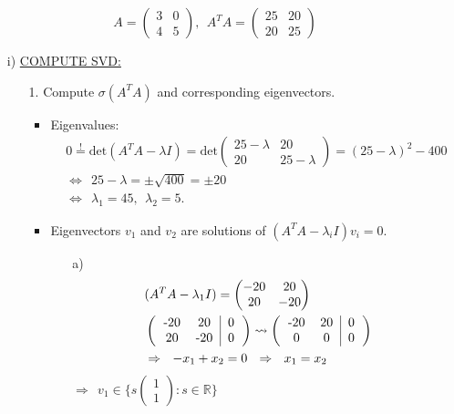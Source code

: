 {
\color{solution}
$$
A=\begin{pmatrix}3&0\\4&5\end{pmatrix},\ \ A^TA=\begin{pmatrix}25&20\\20&25\end{pmatrix}
$$
\begin{enumerate}
	\item[i)]
	\underline{COMPUTE SVD:}
	\begin{enumerate}
		\item[1.]
		Compute $\sigma(A^TA)$ and corresponding eigenvectors.
		\begin{itemize}
			\item 
			Eigenvalues:
			\begin{align*}
			&0\stackrel{!}{=} \text{det}(A^TA-\lambda I)= \text{det}\begin{pmatrix}25-\lambda&20\\20&25-\lambda\end{pmatrix}=(25-\lambda)^2-400\\
			&\Leftrightarrow\ \ 25-\lambda= \pm\sqrt{400}=\pm20\\
			&\Leftrightarrow\ \ \lambda_1=45,\ \ \lambda_2=5.
			\end{align*}
			\item 
			Eigenvectors $v_1$ and $v_2$ are solutions of $(A^TA-\lambda_i I)v_i=0$.
			\begin{enumerate}
				\item[a)]
				\begin{align*}
				&(A^TA-\lambda_1 I)=\begin{pmatrix}-20&20\\20&-20\end{pmatrix}\\
				&\left(
				\begin{tabular}{cc|c} -20&20&0\\20&-20&0\end{tabular}
				\right)\rightsquigarrow 
				\left(
				\begin{tabular}{cc|c} -20&20&0\\0&0&0\end{tabular}
				\right)\\
				&\Rightarrow\ \  -x_1+x_2=0\ \ \Rightarrow\ \ x_1=x_2
				\end{align*}
				$\Rightarrow\ \ v_1\in\{s\begin{pmatrix}1\\1\end{pmatrix}:s\in\mathbb{R}\}$\\

\end{enumerate}
\end{itemize}
\end{enumerate}
\end{enumerate}}
